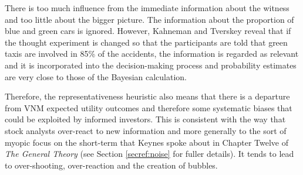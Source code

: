 \documentclass[12pt, a4paper, oneside]{article} %
\begin{document}
There is too much influence from the immediate information about the witness and too little about the bigger picture.  The information about the proportion of blue and green cars is ignored.  However, Kahneman and Tverskey reveal that if the thought experiment is changed so that the participants are told that green taxis are involved in 85\% of the accidents, the information is regarded as relevant and it is incorporated into the decision-making process and probability estimates are very close to those of the Bayesian calculation.  

Therefore, the representativeness heuristic also means that there is a departure from VNM expected utility outcomes and therefore some systematic biases that could be exploited by informed investors. This is consistent with the way that stock analysts over-react to new information \citep{DeBondtAnalysts} and more generally to the sort of myopic focus on the short-term that Keynes spoke about in Chapter Twelve of \emph{The General Theory} (see Section \ref{secref:noise} for fuller details). It tends to lead to over-shooting, over-reaction and the creation of bubbles.    
\end{document}
